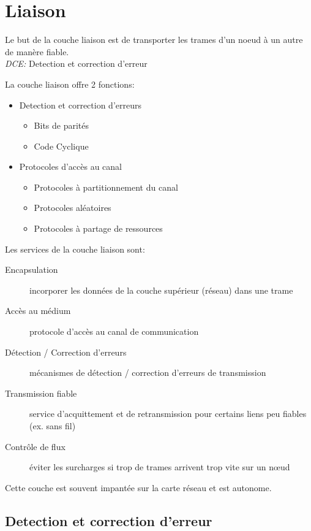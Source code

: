 \documentclass[a4paper, 12pt, french]{article}
\begin{document}
	\section{Liaison}

	Le but de la couche liaison est de transporter les trames d'un noeud à un autre de manère fiable.\\

	\emph{DCE: } Detection et correction d'erreur

	La couche liaison offre 2 fonctions:
	\begin{itemize}
		\item Detection et correction d'erreurs
		\begin{itemize}
			\item Bits de parités
			\item Code Cyclique
		\end{itemize}
		\item Protocoles d'accès au canal
		\begin{itemize}
			\item Protocoles à partitionnement du canal
			\item Protocoles aléatoires
			\item Protocoles à partage de ressources
		\end{itemize}
	\end{itemize}

	Les services de la couche liaison sont:
	\begin{description}
		\item[Encapsulation] incorporer les données de la couche supérieur (réseau) dans une trame
		\item[Accès au médium] protocole d'accès au canal de communication
		\item[Détection / Correction d'erreurs] mécanismes de détection / correction d'erreurs de transmission
		\item[Transmission fiable] service d'acquittement et de retransmission pour certains liens peu fiables (ex. sans fil)
		\item[Contrôle de flux] éviter les surcharges si trop de trames arrivent trop vite sur un nœud
	\end{description}

	Cette couche est souvent impantée sur la carte réseau et est autonome.

	\subsection{Detection et correction d'erreur}
\end{document}
